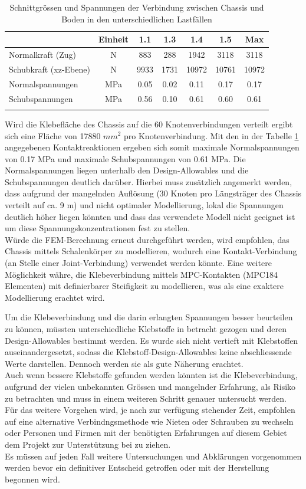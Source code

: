\begin{table}[H]
\centering
\begin{tabular}{lcccccc}
\thickhline
	&	Einheit	&	1.1	&	1.3	&	1.4	&	1.5	&	Max	\\	\hline
Normalkraft (Zug)	&	N	&	883	&	288	&	1942	&	3118	&	3118	\\
Schubkraft (xz-Ebene)	&	N	&	9933	&	1731	&	10972	&	10761	&	10972	\\	\hline
Normalspannungen	&	MPa	&	0.05	&	0.02	&	0.11	&	0.17	&	0.17	\\
Schubspannungen	&	MPa	&	0.56	&	0.10	&	0.61	&	0.60	&	0.61	\\	\thickhline
\end{tabular}
\caption{Schnittgrössen und Spannungen der Verbindung zwischen Chassis und Boden in den unterschiedlichen Lastfällen}
\label{tab:FEMres Boden}
\end{table}


Wird die Klebefläche des Chassis auf die 60 Knotenverbindungen verteilt ergibt sich eine Fläche von 17880 $mm^2$ pro Knotenverbindung. Mit den in der Tabelle \ref{tab:FEMres Boden} angegebenen Kontaktreaktionen ergeben sich somit maximale Normalspannungen von 0.17 MPa und maximale Schubspannungen von 0.61 MPa. Die Normalspannungen liegen unterhalb den Design-Allowables und die Schubspannungen deutlich darüber. Hierbei muss zusätzlich angemerkt werden, dass aufgrund der mangelnden Auflösung (30 Knoten pro Längsträger des Chassis verteilt auf ca. 9 m) und nicht optimaler Modellierung, lokal die Spannungen deutlich höher liegen könnten und dass das verwendete Modell nicht geeignet ist um diese Spannungskonzentrationen fest zu stellen.\\
Würde die FEM-Berechnung erneut durchgeführt werden, wird empfohlen, das Chassis mittels Schalenkörper zu modellieren, wodurch eine Kontakt-Verbindung (an Stelle einer Joint-Verbindung) verwendet werden könnte. Eine weitere Möglichkeit währe, die Klebeverbindung mittels MPC-Kontakten (MPC184 Elementen) mit definierbarer Steifigkeit zu modellieren, was als eine exaktere Modellierung erachtet wird.

Um die Klebeverbindung und die darin erlangten Spannungen besser beurteilen zu können, müssten unterschiedliche Klebstoffe in betracht gezogen und deren Design-Allowables bestimmt werden. Es wurde sich nicht vertieft mit Klebstoffen auseinandergesetzt, sodass die Klebstoff-Design-Allowables keine abschliessende Werte darstellen. Dennoch werden sie als gute Näherung erachtet.\\
Auch wenn bessere Klebstoffe gefunden werden könnten ist die Klebeverbindung, aufgrund der vielen unbekannten Grössen und mangelnder Erfahrung, als Risiko zu betrachten und muss in einem weiteren Schritt genauer untersucht werden. Für das weitere Vorgehen wird, je nach zur verfügung stehender Zeit, empfohlen auf eine alternative Verbindngsmethode wie Nieten oder Schrauben zu wechseln oder Personen und Firmen mit der benötigten Erfahrungen auf diesem Gebiet dem Projekt zur Unterstützung bei zu ziehen.\\
Es müssen auf jeden Fall weitere Untersuchungen und Abklärungen vorgenommen werden bevor ein definitiver Entscheid getroffen oder mit der Herstellung begonnen wird.

